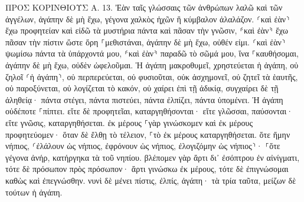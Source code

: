 \documentclass[twoside, 9pt]{extreport}
\begin{document}
ΠΡΟΣ ΚΟΡΙΝΘΙΟΥΣ Α.
13.
Ἐὰν ταῖς γλώσσαις τῶν ἀνθρώπων λαλῶ καὶ τῶν ἀγγέλων, ἀγάπην δὲ μὴ ἔχω, γέγονα χαλκὸς ἠχῶν ἢ κύμβαλον ἀλαλάζον. 
⸂καὶ ἐὰν⸃ ἔχω προφητείαν καὶ εἰδῶ τὰ μυστήρια πάντα καὶ πᾶσαν τὴν γνῶσιν, ⸄καὶ ἐὰν⸅ ἔχω πᾶσαν τὴν πίστιν ὥστε ὄρη ⸀μεθιστάναι, ἀγάπην δὲ μὴ ἔχω, οὐθέν εἰμι. 
⸂καὶ ἐὰν⸃ ψωμίσω πάντα τὰ ὑπάρχοντά μου, ⸄καὶ ἐὰν⸅ παραδῶ τὸ σῶμά μου, ἵνα ⸀καυθήσομαι, ἀγάπην δὲ μὴ ἔχω, οὐδὲν ὠφελοῦμαι. 
Ἡ ἀγάπη μακροθυμεῖ, χρηστεύεται ἡ ἀγάπη, οὐ ζηλοῖ ⸂ἡ ἀγάπη⸃, οὐ περπερεύεται, οὐ φυσιοῦται, 
οὐκ ἀσχημονεῖ, οὐ ζητεῖ τὰ ἑαυτῆς, οὐ παροξύνεται, οὐ λογίζεται τὸ κακόν, 
οὐ χαίρει ἐπὶ τῇ ἀδικίᾳ, συγχαίρει δὲ τῇ ἀληθείᾳ· 
πάντα στέγει, πάντα πιστεύει, πάντα ἐλπίζει, πάντα ὑπομένει. 
Ἡ ἀγάπη οὐδέποτε ⸀πίπτει. εἴτε δὲ προφητεῖαι, καταργηθήσονται· εἴτε γλῶσσαι, παύσονται· εἴτε γνῶσις, καταργηθήσεται. 
ἐκ μέρους ⸀γὰρ γινώσκομεν καὶ ἐκ μέρους προφητεύομεν· 
ὅταν δὲ ἔλθῃ τὸ τέλειον, ⸀τὸ ἐκ μέρους καταργηθήσεται. 
ὅτε ἤμην νήπιος, ⸂ἐλάλουν ὡς νήπιος, ἐφρόνουν ὡς νήπιος, ἐλογιζόμην ὡς νήπιος⸃· ⸀ὅτε γέγονα ἀνήρ, κατήργηκα τὰ τοῦ νηπίου. 
βλέπομεν γὰρ ἄρτι δι᾽ ἐσόπτρου ἐν αἰνίγματι, τότε δὲ πρόσωπον πρὸς πρόσωπον· ἄρτι γινώσκω ἐκ μέρους, τότε δὲ ἐπιγνώσομαι καθὼς καὶ ἐπεγνώσθην. 
νυνὶ δὲ μένει πίστις, ἐλπίς, ἀγάπη· τὰ τρία ταῦτα, μείζων δὲ τούτων ἡ ἀγάπη. 
\end{document}
